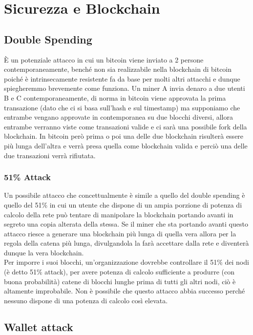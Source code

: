 \section{Sicurezza e Blockchain}

\subsection{Double Spending}

È un potenziale attacco in cui un bitcoin viene inviato a 2 persone
contemporaneamente, benché non sia realizzabile nella blockchain di bitcoin
poiché è intrinsecamente resistente fa da base per molti altri attacchi e dunque
spiegheremmo brevemente come funziona. Un miner A invia denaro a due utenti B e
C contemporaneamente, di norma in bitcoin viene approvata la prima transazione
(dato che ci si basa sull'hash e sul timestamp) ma supponiamo che entrambe
vengano approvate in contemporanea su due blocchi diversi, allora entrambe
verranno viste come transazioni valide e ci sarà una possibile fork della
blockchain. In bitcoin però prima o poi una delle due blockchain
risulterà essere più lunga dell'altra e verrà presa quella come blockchain
valida e perciò una delle due transazioni verrà rifiutata.

\subsubsection{51\% Attack}

Un possibile attacco che concettualmente è simile a quello del double spending è
quello del 51\% in cui un utente che dispone di un ampia porzione di potenza di
calcolo della rete può tentare di manipolare la blockchain portando avanti in
segreto una copia alterata della stessa. Se il miner che sta portando avanti
questo attacco riesce a generare una blockchain più lunga di quella vera allora
per la regola della catena più lunga, divulgandola la farà accettare dalla rete
e diventerà dunque la vera blockchain.\\
Per imporre i suoi blocchi, un'organizzazione dovrebbe controllare il 51\% dei
nodi (è detto 51\% attack), per avere potenza di calcolo sufficiente a produrre
(con buona probabilità) catene di blocchi lunghe prima di tutti gli altri nodi,
ciò è altamente improbabile. Non è possibile che questo attacco abbia successo
perché nessuno dispone di una potenza di calcolo così elevata.

\subsection{Wallet attack}

